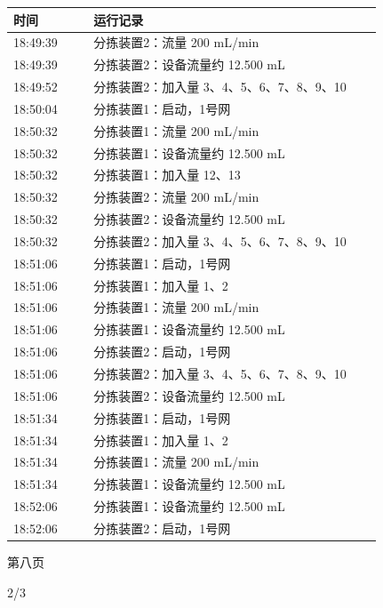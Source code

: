 \documentclass[UTF8,10pt,a4paper,fontset=fandol]{ctexart}
\newcommand{\handwritten}[1]{#1}
\begin{document}
\begin{center}
\begin{minipage}[t]{0.47\linewidth}
\scriptsize
\begin{tabular}{|p{0.20\linewidth}|p{0.72\linewidth}|}
\hline
时间 & 运行记录 \\ \hline
18:49:39 & 分拣装置2：流量 200 mL/min \\ \hline
18:49:39 & 分拣装置2：设备流量约 12.500 mL \\ \hline
18:49:52 & 分拣装置2：加入量 3、4、5、6、7、8、9、10 \\ \hline
18:50:04 & 分拣装置1：启动，1号网 \\ \hline
18:50:32 & 分拣装置1：流量 200 mL/min \\ \hline
18:50:32 & 分拣装置1：设备流量约 12.500 mL \\ \hline
18:50:32 & 分拣装置1：加入量 12、13 \\ \hline
18:50:32 & 分拣装置2：流量 200 mL/min \\ \hline
18:50:32 & 分拣装置2：设备流量约 12.500 mL \\ \hline
18:50:32 & 分拣装置2：加入量 3、4、5、6、7、8、9、10 \\ \hline
18:51:06 & 分拣装置1：启动，1号网 \\ \hline
18:51:06 & 分拣装置1：加入量 1、2 \\ \hline
18:51:06 & 分拣装置1：流量 200 mL/min \\ \hline
18:51:06 & 分拣装置1：设备流量约 12.500 mL \\ \hline
18:51:06 & 分拣装置2：启动，1号网 \\ \hline
18:51:06 & 分拣装置2：加入量 3、4、5、6、7、8、9、10 \\ \hline
18:51:06 & 分拣装置2：设备流量约 12.500 mL \\ \hline
18:51:34 & 分拣装置1：启动，1号网 \\ \hline
18:51:34 & 分拣装置1：加入量 1、2 \\ \hline
18:51:34 & 分拣装置1：流量 200 mL/min \\ \hline
18:51:34 & 分拣装置1：设备流量约 12.500 mL \\ \hline
18:52:06 & 分拣装置1：设备流量约 12.500 mL \\ \hline
18:52:06 & 分拣装置2：启动，1号网 \\ \hline
\end{tabular}

\vspace{2mm}
第八页
\end{minipage}
\end{center}

\handwritten{2/3}
\end{document}

